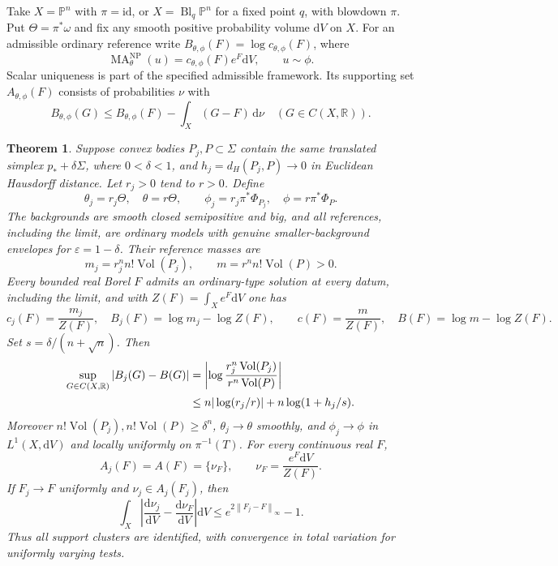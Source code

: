\documentclass[11pt]{article}
\newtheorem{theorem}{Theorem}[section]
\newcommand{\Vol}{\operatorname{Vol}}
\newcommand{\MA}{\operatorname{MA}}
\newcommand{\CP}{\mathbb P}
\newcommand{\norm}[1]{\left\|#1\right\|}
\begin{document}
Take $X=\CP^n$ with $\pi=\mathrm{id}$, or
$X=\operatorname{Bl}_q\CP^n$ for a fixed point $q$, with blowdown $\pi$.
Put $\Theta=\pi^*\omega$ and fix any smooth positive probability
volume $\mathrm dV$ on $X$. For an admissible ordinary reference write
$B_{\theta,\phi}(F)=\log c_{\theta,\phi}(F)$, where
\[
 \MA_\theta^{\mathrm{NP}}(u)=c_{\theta,\phi}(F)e^F\mathrm dV,
 \qquad u\sim\phi.
\]
Scalar uniqueness is part of the specified admissible framework.
Its supporting set $A_{\theta,\phi}(F)$ consists of probabilities $\nu$ with
\[
 B_{\theta,\phi}(G)\le B_{\theta,\phi}(F)
                   -\int_X(G-F)\,\mathrm d\nu
 \quad(G\in C(X,\mathbb R)).
\]

\begin{theorem}\label{thm:criterion}
Suppose convex bodies $P_j,P\subset\Sigma$ contain the same translated
simplex $p_*+\delta\Sigma$, where $0<\delta<1$, and
$h_j=d_H(P_j,P)\to0$ in Euclidean Hausdorff distance. Let
$r_j>0$ tend to $r>0$. Define
\[
 \theta_j=r_j\Theta,\quad \theta=r\Theta,\qquad
 \phi_j=r_j\pi^*\Phi_{P_j},\quad \phi=r\pi^*\Phi_P.
\]
The backgrounds are smooth closed semipositive and big, and all references,
including the limit, are ordinary models with genuine smaller-background
envelopes for $\varepsilon=1-\delta$. Their reference masses are
\[
 m_j=r_j^n n!\Vol(P_j),\qquad m=r^n n!\Vol(P)>0.
\]
Every bounded real Borel $F$ admits an ordinary-type solution at every
datum, including the limit, and with $Z(F)=\int_Xe^F\mathrm dV$ one has
\[
 c_j(F)=\frac{m_j}{Z(F)},\quad B_j(F)=\log m_j-\log Z(F),\qquad
 c(F)=\frac m{Z(F)},\quad B(F)=\log m-\log Z(F).
\]
Set $s=\delta/(n+\sqrt n)$. Then
\begin{align}
 \sup_{G\in C(X,\mathbb R)}|B_j(G)-B(G)|
 &=\left|\log\frac{r_j^n\Vol(P_j)}{r^n\Vol(P)}\right|\notag\\
 &\le n|\log(r_j/r)|+n\log(1+h_j/s).\label{eq:functional-bound}
\end{align}
Moreover $n!\Vol(P_j),n!\Vol(P)\ge\delta^n$,
$\theta_j\to\theta$ smoothly, and $\phi_j\to\phi$ in
$L^1(X,\mathrm dV)$ and locally uniformly on $\pi^{-1}(T)$.
For every continuous real $F$,
\[
 A_j(F)=A(F)=\{\nu_F\},\qquad
 \nu_F=\frac{e^F\mathrm dV}{Z(F)}.
\]
If $F_j\to F$ uniformly and $\nu_j\in A_j(F_j)$, then
\[
 \int_X\left|\frac{\mathrm d\nu_j}{\mathrm dV}
             -\frac{\mathrm d\nu_F}{\mathrm dV}\right|\mathrm dV
 \le e^{2\norm{F_j-F}_\infty}-1.
\]
Thus all support clusters are identified, with convergence in total
variation for uniformly varying tests.
\end{theorem}
\end{document}
